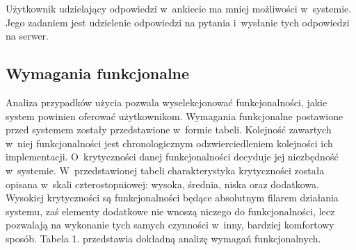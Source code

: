 \documentclass[8pt,a4paper,notitlepage]{article}
\begin{document}
Użytkownik udzielający odpowiedzi w~ankiecie ma mniej możliwości w~systemie. Jego zadaniem jest udzielenie odpowiedzi na pytania i~wysłanie tych odpowiedzi na serwer.

\subsection{Wymagania funkcjonalne}
Analiza przypadków użycia pozwala wyselekcjonować funkcjonalności, jakie system powinien oferować użytkownikom. Wymagania funkcjonalne postawione przed systemem zostały przedstawione w~formie tabeli. Kolejność zawartych w~niej funkcjonalności jest chronologicznym odzwierciedleniem kolejności ich implementacji. O~krytyczności danej funkcjonalności decyduje jej niezbędność w~systemie. W~przedstawionej tabeli charakterystyka krytyczności została opisana w~skali czterostopniowej: wysoka, średnia, niska oraz dodatkowa. Wysokiej krytyczności są funkcjonalności będące absolutnym filarem działania systemu, zaś elementy dodatkowe nie wnoszą niczego do funkcjonalności, lecz pozwalają na wykonanie tych samych czynności w~inny, bardziej komfortowy sposób. Tabela 1. przedstawia dokładną analizę wymagań funkcjonalnych.
\end{document}
